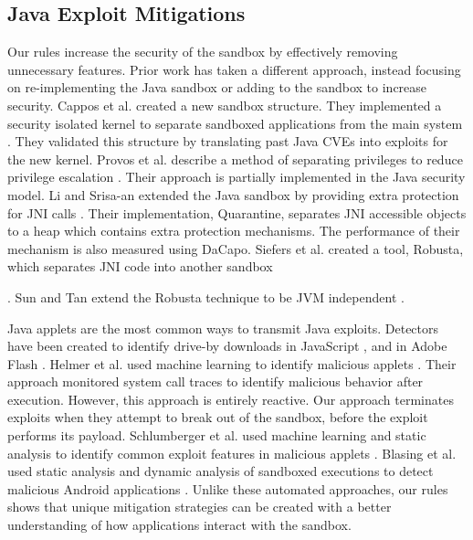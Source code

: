 \documentclass{sig-alternate}
\begin{document}
\subsection{Java Exploit Mitigations}\label{sub:Related-Work-Mitigation}

Our rules increase the security of the sandbox
by effectively removing unnecessary features. Prior work has taken a different
approach, instead focusing on re-implementing the Java sandbox or
adding to the sandbox to increase security. Cappos et al. created
a new sandbox structure. They implemented a security isolated kernel
to separate sandboxed applications from the main system \cite{cappos_retaining_2010}.
They validated this structure by translating past Java CVEs into exploits
for the new kernel. Provos et al. describe a method of separating
privileges to reduce privilege escalation \cite{Provos-PrivilegeEscalation}.
Their approach is partially implemented in the Java security model.
Li and Srisa-an extended the Java sandbox by providing extra protection
for JNI calls \cite{li_quarantine:_2011}. Their implementation, Quarantine,
separates JNI accessible objects to a heap which contains extra protection
mechanisms. The performance of their mechanism is also measured using
DaCapo. Siefers et al. created a tool, Robusta, which separates JNI
code into another sandbox \cite{siefers_robusta:_2010}%

. Sun and Tan extend the Robusta technique to be JVM independent \cite{sun_jvm-portable_2012}. 

Java applets are the most common ways to transmit Java exploits. Detectors
have been created to identify drive-by downloads in JavaScript \cite{cova_detection_2010},
and in Adobe Flash \cite{ford_analyzing_2009}. Helmer et al. used
machine learning to identify malicious applets \cite{helmer_anomalous_2001}.
Their approach monitored system call traces to identify malicious
behavior after execution. However, this approach is entirely reactive.
Our approach terminates exploits when they attempt to break out of
the sandbox, before the exploit performs its payload. Schlumberger
et al. used machine learning and static analysis to identify common
exploit features in malicious applets \cite{schlumberger_jarhead_2012}.
Blasing et al. used static analysis and dynamic analysis of sandboxed
executions to detect malicious Android applications \cite{Blasing-AndriodSandbox}.
Unlike these automated approaches, our rules shows that unique
mitigation strategies can be created with a better understanding of
how applications interact with the sandbox. 
\end{document}
